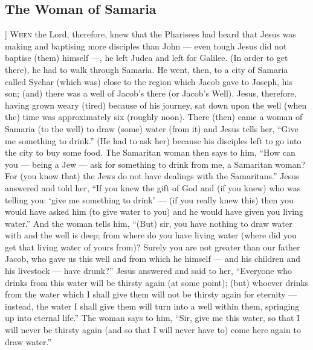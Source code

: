 \begin{pages}
\begin{Leftside}
        			\chapter{The Woman of Samaria}
        	   ]
        \renewcommand\LettrineFontHook{\Zallmanfamily}
		\lettrine[lines=3]{W}{hen} the Lord, therefore, knew that the Pharisees had heard that Jesus was making and baptising more disciples than John — even tough Jesus did not baptise (them) himself —, he left Judea and left for Galilee. (In order to get there), he had to walk through Samaria. He went, then, to a city of Samaria called Sychar (which was) close to the region which Jacob gave to Joseph, his son; (and) there was a well of Jacob’s there (or Jacob’s Well). Jesus, therefore, having grown weary (tired) because of his journey, sat down upon the well (when the) time was approximately six (roughly noon). 
		\pend
		\pstart		
		There (then) came a woman of Samaria (to the well) to draw (some) water (from it) and Jesus tells her, “Give me something to drink.” (He had to ask her) because his disciples left to go into the city to buy some food. The Samaritan woman then says to him, “How can you — being a Jew — ask for something to drink from me, a Samaritan woman? For (you know that) the Jews do not have dealings with the Samaritans.” Jesus answered and told her, “If you knew the gift of God and (if you knew) who was telling you: ‘give me something to drink’ — (if you really knew this) then you would have asked him (to give water to you) and he would have given you living water.” And the woman tells him, “(But) sir, you have nothing to draw water with and the well is deep; from where do you have living water (where did you get that living water of yours from)? Surely you are not greater than our father Jacob, who gave us this well and from which he himself — and his children and his livestock — have drunk?” Jesus answered and said to her, “Everyone who drinks from this water will be thirsty again (at some point); (but) whoever drinks from the water which I shall give them will not be thirsty again for eternity — instead, the water I shall give them will turn into a well within them, springing up into eternal life.” The woman says to him, “Sir, give me this water, so that I will never be thirsty again (and so that I will never have to) come here again to draw water.” 
		\pend
		\pstart

\end{Leftside}
\end{pages}
